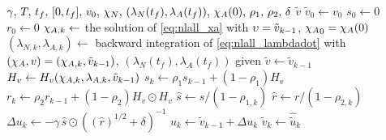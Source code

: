 \begin{algorithm}[!t]
	\caption{Steady-state ADAM algorithm \cite{masocco_dynamic_2024}.}
	\label{alg:nlall_adam}
	\begin{algorithmic}[1]
		\Require $\gamma,\,T,\,t_f,\,[0,t_f],\,v_0,\,\chi_N,\,(\lambda_N(t_f),\lambda_A(t_f)),\,\chi_A(0),\,\rho_1,\,\rho_2,\,\delta$
		\Ensure $\tilde{v}$
		\State $\tilde{v}_0 \gets v_0$
		\State $s_0\gets0$
		\State $r_0\gets0$
			\State $\chi_{A,k} \gets$ the solution of \eqref{eq:nlall_xa} with $\upsilon=\tilde{v}_{k-1}$, ${\chi_A}_0=\chi_A(0)$
			\State $(\lambda_{N,k},\lambda_{A,k}) \gets$ backward integration of \eqref{eq:nlall_lambdadot} with
      \Statex \hspace{3.05cm}$(\chi_A,v)=(\chi_{A,k},\tilde{v}_{k-1})$, $(\lambda_N(t_f),\lambda_A(t_f))$ given
        \Return $\tilde{v} \gets \tilde{v}_{k-1}$
			\Else
				\State $H_v \gets H_v(\chi_{A,k},\lambda_{A,k},\tilde{v}_{k-1})$
				\State $s_k\gets\rho_1s_{k-1}+(1-\rho_1)H_v$
				\State $r_k\gets\rho_2r_{k-1}+(1-\rho_2)H_v \odot H_v$
				\State $\hat{s} \gets s/(1-\rho_{1,k})$
				\State $\hat{r} \gets r/(1-\rho_{2,k})$
				\State $\Delta u_k\gets-\gamma\,\hat{s}\odot((\hat{r})^{1/2}+\delta)^{-1}$
				\State $u_k \gets \tilde{v}_{k-1} + \Delta u_{k} $
				\State $\tilde{v}_{k} \gets \hat{\tilde{u}}_k$ 
			\EndIf
		\EndFor
	\end{algorithmic}
\end{algorithm}

